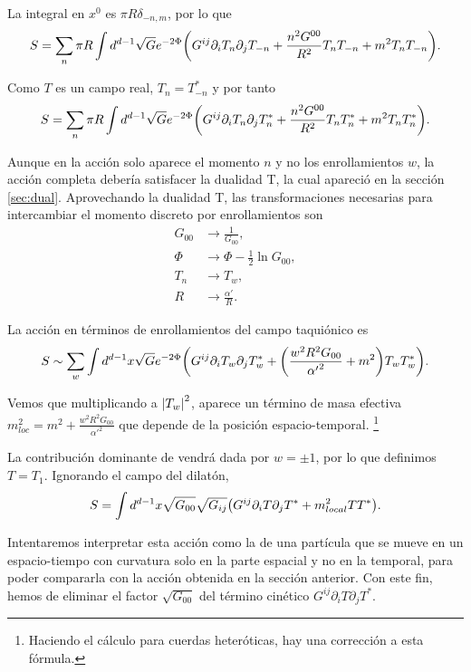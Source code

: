La integral en $x^0$ es $\pi R \delta_{-n,m}$, por lo que
\begin{equation}
  S=\sum_n\pi R \int d^{d-1} \sqrt{G}e^{-2\Phi}\qty(G^{ij}\partial_i T_n \partial_j T_{-n} + \frac{n^2 G^{00}}{R^2}T_n T_{-n} + m^2 T_n T_{-n}).
\end{equation}

Como $T$ es un campo real, $T_n=T^*_{-n}$ y por tanto
\begin{equation}
  S=\sum_n \pi R \int d^{d-1} \sqrt{G}e^{-2\Phi}\qty(G^{ij}\partial_i T_n \partial_j T_{n}^* + \frac{n^2 G^{00}}{R^2}T_n T_{n}^* + m^2 T_n T_{n}^*).
\end{equation}

Aunque en la acción solo aparece el momento $n$ y no los enrollamientos $w$, la acción completa debería satisfacer la dualidad T, 
la cual apareció en la sección \ref{sec:dual}.
Aprovechando la dualidad T, las  transformaciones necesarias para intercambiar el momento discreto por enrollamientos son
\begin{equation}
  \begin{aligned}
    G_{00}&\to \frac{1}{G_{00}},\\
    \Phi&\to \Phi -\frac{1}{2}\ln G_{00},\\
    T_n&\to T_w,\\
    R &\to \frac{\alpha'}{R}.
  \end{aligned}
\end{equation}

La acción en términos de enrollamientos del campo taquiónico es
\begin{equation}
  S \sim\sum_w  \int d^{d-1} x \sqrt G e^{-2\Phi}\qty(G^{ij}\partial_i T_w \partial_j T_{w}^* + \qty(\frac{w^2 R^2 G_{00}}{{\alpha'}^2} + m^2) T_w T_{w}^*) .
\end{equation}

Vemos que multiplicando a $\abs{T_w}^2$, aparece un término de masa efectiva $m^2_{loc} = m^2 +\frac{w^2 R^2 G_{00}}{{\alpha'}^2}$
que depende de la posición espacio-temporal.
\footnote{Haciendo el cálculo para cuerdas heteróticas, hay una corrección a esta fórmula.}

La contribución dominante de vendrá dada por $w=\pm 1$, por lo que definimos $T=T_1$.
Ignorando el campo del dilatón,
\begin{equation}
  S  =  \int d^{d-1} x \sqrt{G_{00}}\sqrt{G_{ij}} \qty(G^{ij}\partial_i T \partial_j T^* +m^2_{local} TT^*) .
\end{equation}

Intentaremos interpretar esta acción como la de una partícula que se mueve en un espacio-tiempo con 
curvatura solo en la parte espacial y no en la temporal, para poder compararla con la acción obtenida
en la sección anterior.
Con este fin, hemos de eliminar el factor $\sqrt{G_{00}}$ del término cinético $G^{ij}\partial_i T \partial_j T^*$.

